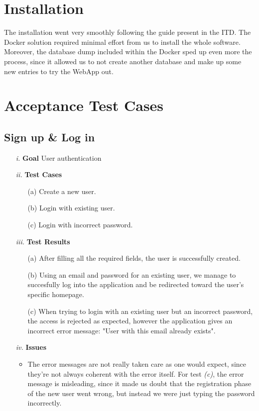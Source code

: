 \documentclass[table, 12pt]{article}
\begin{document}
\section{Installation}
The installation went very smoothly following the guide present in the ITD. The Docker solution required minimal effort from us to install the whole software. Moreover, the database dump included within the Docker sped up even more the process, since it allowed us to not create another database and make up some new entries to try the WebApp out.

\section{Acceptance Test Cases}

\subsection{Sign up \& Log in}
\begin{itemize}
    \item[\textit{i.}] \textbf{Goal} User authentication
    \item[\textit{ii.}] \textbf{Test Cases}
    \begin{itemize}
        \item[(a)] Create a new user.
        \item[(b)] Login with existing user.
        \item[(c)] Login with incorrect password.
    \end{itemize} 
    \item[\textit{iii.}] \textbf{Test Results}
    \begin{itemize}
        \item[(a)] After filling all the required fields, the user is successfully created.
        \item[(b)] Using an email and password for an existing user, we manage to succesfully log into the application and be redirected toward the user's specific homepage.
        \item[(c)] When trying to login with an existing user but an incorrect password, the access is rejected as expected, however the application gives an incorrect error message: "User with this email already exists". 
    \end{itemize} 
    \item[\textit{iv.}] \textbf{Issues}    
    \begin{itemize}
        \item The error messages are not really taken care as one would expect, since they're not always coherent with the error itself. For test \emph{(c)}, the error message is misleading, since it made us doubt that the registration phase of the new user went wrong, but instead we were just typing the password incorrectly.
    \end{itemize} 
\end{itemize}
\end{document}
